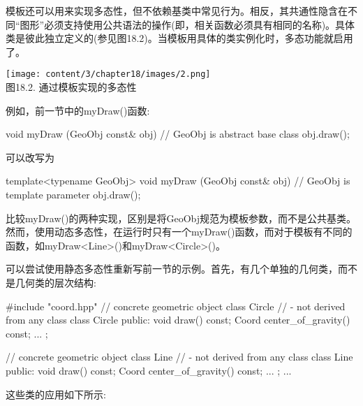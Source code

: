 
模板还可以用来实现多态性，但不依赖基类中常见行为。相反，其共通性隐含在不同“图形”必须支持使用公共语法的操作(即，相关函数必须具有相同的名称)。具体类是彼此独立定义的(参见图18.2)。当模板用具体的类实例化时，多态功能就启用了。

\begin{center}
\texttt{[image: content/3/chapter18/images/2.png]} \\
图18.2. 通过模板实现的多态性
\end{center}

例如，前一节中的myDraw()函数:

\begin{cpp}
void myDraw (GeoObj const& obj) // GeoObj is abstract base class
{
	obj.draw();
}
\end{cpp}

可以改写为

\begin{cpp}
template<typename GeoObj>
void myDraw (GeoObj const& obj) // GeoObj is template parameter
{
	obj.draw();
}
\end{cpp}

比较myDraw()的两种实现，区别是将GeoObj规范为模板参数，而不是公共基类。然而，使用动态多态性，在运行时只有一个myDraw()函数，而对于模板有不同的函数，如myDraw<Line>()和myDraw<Circle>()。

可以尝试使用静态多态性重新写前一节的示例。首先，有几个单独的几何类，而不是几何类的层次结构:

\begin{cpp}
#include "coord.hpp"
// concrete geometric object class Circle
// - not derived from any class
class Circle {
	public:
	void draw() const;
	Coord center_of_gravity() const;
	...
};

// concrete geometric object class Line
// - not derived from any class
class Line {
	public:
	void draw() const;
	Coord center_of_gravity() const;
	...
};
...
\end{cpp}

这些类的应用如下所示:

